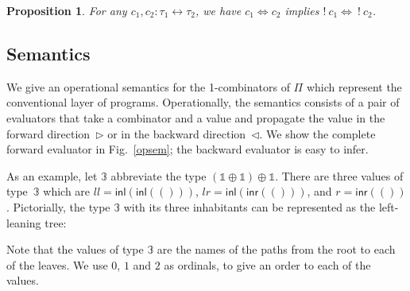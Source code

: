 \documentclass[a4paper,USenglish]{lipics-v2016-utf8x}
\newcommand{\iso}{\leftrightarrow}
\newcommand{\isotwo}{\Leftrightarrow}
\newcommand{\inl}[1]{\textsf{inl}(#1)}
\newcommand{\inr}[1]{\textsf{inr}(#1)}
\newcommand{\ot}{\mathbb{1}}
\newcommand{\unitv}{()}
\newtheorem{proposition}{Proposition}
\begin{document}
\begin{proposition}
For any $c_1,c_2 : \tau_1 \iso \tau_2$, we have $c_1 \isotwo c_2$ implies
$!~c_1 \isotwo ~!~c_2$.
\end{proposition}

\subsection{Semantics}
\label{sec:pisem}

We give an operational semantics for the 1-combinators of $\Pi$ which
represent the conventional layer of programs.  Operationally, the
semantics consists of a pair of evaluators that
take a combinator and a value and propagate the value in the forward
direction~$\triangleright$ or in the backward
direction~$\triangleleft$. We show the complete forward evaluator in
Fig.~\ref{opsem}; the backward evaluator is easy to infer.

As an example, let $\mathbb{3}$ abbreviate the type
$(\ot \oplus \ot) \oplus \ot$. There are three values of
type~$\mathbb{3}$ which are $ll=\inl{\inl{\unitv}}$,
$lr=\inl{\inr{\unitv}}$, and $r=\inr{\unitv}$. Pictorially, the type
$\mathbb{3}$ with its three inhabitants can be represented as the
left-leaning tree:
\begin{center}
\end{center}
Note that the values of type $\mathbb{3}$ are the names of
the paths from the root to each of the leaves.  We use
$0$, $1$ and $2$ as ordinals, to give an order to each
of the values.
\end{document}
